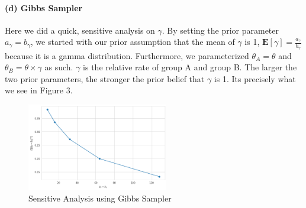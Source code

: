 \documentclass[11pt, letterpaper]{article}
\begin{document}
\paragraph{(d) Gibbs Sampler}
Here we did a quick, sensitive analysis on $\gamma$. By setting the prior parameter $a_\gamma = b_\gamma$, we started with our prior assumption that the mean of $\gamma$ is 1, $\mathbf{E}[\gamma] = \frac{a_\gamma}{b_\gamma}$ because it is a gamma distribution. Furthermore, we parameterized $\theta_A = \theta$ and $\theta_B = \theta \times \gamma$ as such. $\gamma$ is the relative rate of group A and group B. The larger the two prior parameters, the stronger the prior belief that $\gamma$ is 1. Its precisely what we see in Figure 3. 
\begin{figure}[!h]
  \centering
  \includegraphics[width=0.55\textwidth]{6.1.d.png}
  \captionsetup{justification=centering}
  \caption{Sensitive Analysis using Gibbs Sampler}
\end{figure}

\newpage
\end{document}
